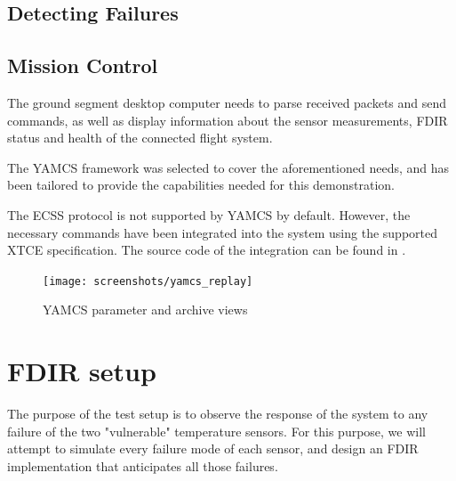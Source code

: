 \documentclass[a4paper,nobib]{tufte-book}
\begin{document}


\subsection{Detecting Failures}

\subsection{Mission Control}

The ground segment desktop computer needs to parse received packets and send commands, as well as display information about the sensor measurements, \ac{FDIR} status and health of the connected flight system.

The \acs{YAMCS} \autocite{sela_yamcs_lightweight_2012} framework was selected to cover the aforementioned needs, and has been tailored to provide the capabilities needed for this demonstration.

The \ac{ECSS} protocol\autocite{ECSS-E-ST-70-41C} is not supported by \acs{YAMCS} by default. However, the necessary commands have been integrated into the system using the supported \ac{XTCE} specification.\autocite{simon_xtce_standard_2004} The source code of the integration can be found in .

\begin{figure}[h]
	\texttt{[image: screenshots/yamcs\_replay]}
	\caption{\acs{YAMCS} parameter and archive views}
\end{figure}

\section{\ac{FDIR} setup}

The purpose of the test setup is to observe the response of the system to any failure of the two "vulnerable" temperature sensors. For this purpose, we will attempt to simulate every failure mode of each sensor, and design an \ac{FDIR} implementation that anticipates all those failures.
\end{document}
